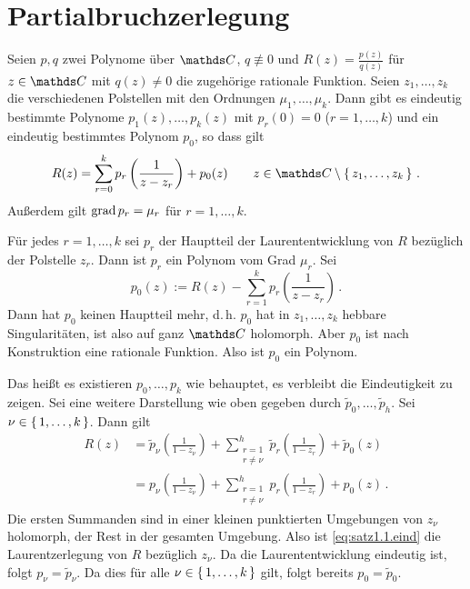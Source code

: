 \section{Partialbruchzerlegung}

\begin{satz}
Seien $p, q$ zwei Polynome über $\CC$, $q \not\equiv 0$ und $R(z) = \frac{p(z)}{q(z)}$ für $z\in\CC$ mit $q(z)\not= 0$ die zugehörige rationale Funktion.
Seien $z_1, \ldots, z_k$ die verschiedenen Polstellen mit den Ordnungen $\mu_1,\ldots, \mu_k$.
Dann gibt es eindeutig bestimmte Polynome $p_1(z), \ldots, p_k(z)$ mit $p_r(0) = 0$ ($r=1,\ldots,k$) und ein eindeutig bestimmtes Polynom $p_0$, so dass gilt
\[
	R(z)
	= \sum_{r=0}^k p_r\left(\frac{1}{z-z_r}\right) + p_0(z)
	\qquad z \in \CC\setminus\Set{z_1, \ldots, z_k}
	\,.
\]
Außerdem gilt $\operatorname{grad} p_r = \mu_r$ für $r=1,\ldots,k$.
\end{satz}

\begin{bewe}
Für jedes $r=1,\ldots,k$ sei $p_r$ der Hauptteil der Laurententwicklung von $R$ bezüglich der Polstelle $z_r$.
Dann ist $p_r$ ein Polynom vom Grad $\mu_r$.
Sei
\[
	p_0(z) := R(z) - \sum_{r=1}^k p_r\left(\frac{1}{z-z_r}\right)\,.
\]
Dann hat $p_0$ keinen Hauptteil mehr, d.\,h. $p_0$ hat in $z_1,\ldots,z_k$ hebbare Singularitäten, ist also auf ganz $\CC$ holomorph.
Aber $p_0$ ist nach Konstruktion eine rationale Funktion.
Also ist $p_0$ ein Polynom.

Das heißt es existieren $p_0, \ldots, p_k$ wie behauptet, es verbleibt die Eindeutigkeit zu zeigen. Sei eine weitere Darstellung wie oben gegeben durch $\tilde{p}_0, \ldots, \tilde{p}_h$.
Sei $\nu \in \left\{\,1,\ldots,k\,\right\}$.
Dann gilt
\begin{align}\label{eq:satz1.1.eind}
	R(z)
	&= \tilde{p}_\nu\left(\frac{1}{1-z_\nu}\right) + \sum_{\substack{r=1\\\scriptscriptstyle r\not=\nu}}^h \tilde{p}_r\left(\frac{1}{1-z_r}\right) + \tilde{p}_0(z) \\
	&= p_\nu\left(\frac{1}{1-z_\nu}\right) + \sum_{\substack{r=1\\\scriptscriptstyle r\not=\nu}}^h p_r\left(\frac{1}{1-z_r}\right) + p_0(z)
	\,. \nonumber
\end{align}
Die ersten Summanden sind in einer kleinen punktierten Umgebungen von $z_\nu$ holomorph, der Rest in der gesamten Umgebung.
Also ist \eqref{eq:satz1.1.eind} die Laurentzerlegung von $R$ bezüglich $z_\nu$.
Da die Laurententwicklung eindeutig ist, folgt $p_\nu = \tilde{p}_\nu$.
Da dies für alle $\nu \in \left\{\,1,\ldots,k\,\right\}$ gilt, folgt bereits $p_0 = \tilde{p}_0$.
\end{bewe}

